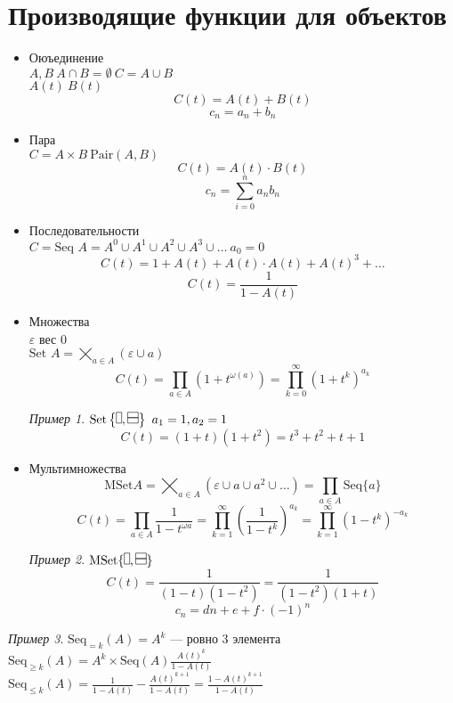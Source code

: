 \documentclass[oneside]{book}
\theoremstyle{plain}
\theoremstyle{remark}
\newtheorem*{examp}{Пример}
\theoremstyle{definition}
\begin{document}
\section{Производящие функции для объектов}
\label{sec:org85adb63}
\begin{itemize}
\item Оюъединение \\
\(A, B\ A \cap B = \emptyset\ C = A \cup B\) \\
\(A(t)\ B(t)\)
\[ C(t) = A(t) + B(t)\]
\[ c_n = a_n + b_n \]
\item Пара \\
\(C = A \times B\ \text{Pair}(A, B)\)
\[C(t) = A(t) \cdot B(t)\] 
\[ c_n = \sum_{i = 0}^na_nb_n \]
\item Последовательности \\
\(C = \text{Seq }A = A^0 \cup A^1 \cup A^2 \cup A^3 \cup \dots\ a_0 = 0\)
\[ C(t) = 1 + A(t) + A(t)\cdot A(t) + A(t)^3 + \dots \]
\[ C(t) = \frac{1}{1 - A(t)} \]
\item Множества \\
\(\varepsilon\) вес \(0\) \\
\(\text{Set }A = \bigtimes_{a \in A} (\varepsilon \cup a)\) \\
\[ C(t) = \prod_{a \in A}(1 + t^{\omega(a)}) = \prod_{k = 0}^\infty (1 + t^k)^{a_k} \]
\begin{examp}
\(\text{Set}\left\{\vdomino, \hdomino\right\}\ a_1 = 1,a_2 = 1\) \\
\[ C(t) = (1 + t)(1 + t^2) = t^3 + t^2 + t + 1 \]
\end{examp}
\item Мультимножества \\
\[\text{MSet} A = \bigtimes_{a \in A}(\varepsilon \cup a \cup a^2 \cup \dots) = \prod_{a \in A}\text{Seq}\{a\}\]
\[ C(t) = \prod_{a \in A}\frac{1}{1 - t^{\omega{a}}} = \prod_{k = 1}^\infty\left(\frac{1}{1 - t^k}\right)^{a_k} = \prod_{k = 1}^\infty(1 - t^k)^{-a_k}\]
\begin{examp}
\(\text{MSet}\{\vdomino, \hdomino\}\)
\[ C(t) = \frac{1}{(1 - t)(1 - t^2)} = \frac{1}{(1 - t^2)(1 + t)} \]
\[ c_n = dn + e + f\cdot(-1)^n \]
\end{examp}
\end{itemize}
\begin{examp}
\(\text{Seq}_{=k}(A) = A^k\) --- ровно 3 элемента \\
\(\text{Seq}_{\ge k}(A) = A^k \times \text{Seq}(A)\frac{A(t)^k}{1 - A(t)}\) \\
\(\text{Seq}_{\le k}(A) = \frac{1}{1 - A(t)} - \frac{A(t)^{k + 1}}{1 - A(t)} = \frac{1 - A(t)^{k + 1}}{1 - A(t)}\)
\end{examp}
\end{document}
